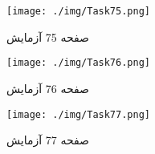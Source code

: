  
\begin{figure}[htpb]
\centering
\texttt{[image: ./img/Task75.png]}
\caption{ صفحه 75 آزمایش }
\label{fig:Task75}
\end{figure}
 
 
\begin{figure}[htpb]
\centering
\texttt{[image: ./img/Task76.png]}
\caption{ صفحه 76 آزمایش }
\label{fig:Task76}
\end{figure}
 
 
\begin{figure}[htpb]
\centering
\texttt{[image: ./img/Task77.png]}
\caption{ صفحه 77 آزمایش }
\label{fig:Task77}
\end{figure}






